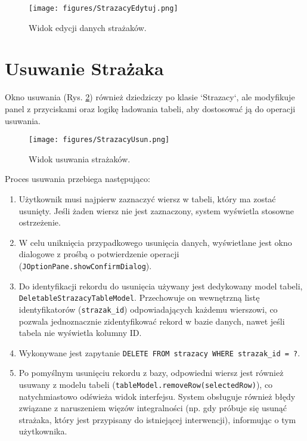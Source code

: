 \begin{figure}[H]
	\centering
	\texttt{[image: figures/StrazacyEdytuj.png]}
	\caption{Widok edycji danych strażaków.}
	\label{fig:strazacy_edytuj_widok}
\end{figure}

\section*{Usuwanie Strażaka}
\label{sec:strazacy_usuwanie}

Okno usuwania (Rys. \ref{fig:strazacy_usun_widok}) również dziedziczy po klasie `Strazacy`, ale modyfikuje panel z przyciskami oraz logikę ładowania tabeli, aby dostosować ją do operacji usuwania.

\begin{figure}[H]
	\centering
	\texttt{[image: figures/StrazacyUsun.png]}
	\caption{Widok usuwania strażaków.}
	\label{fig:strazacy_usun_widok}
\end{figure}

Proces usuwania przebiega następująco:
\begin{enumerate}
    \item Użytkownik musi najpierw zaznaczyć wiersz w tabeli, który ma zostać usunięty. Jeśli żaden wiersz nie jest zaznaczony, system wyświetla stosowne ostrzeżenie.
    \item W celu uniknięcia przypadkowego usunięcia danych, wyświetlane jest okno dialogowe z prośbą o potwierdzenie operacji (\texttt{JOptionPane.showConfirmDialog}).
    \item Do identyfikacji rekordu do usunięcia używany jest dedykowany model tabeli, \texttt{DeletableStrazacyTableModel}. Przechowuje on wewnętrzną listę identyfikatorów (\texttt{strazak\_id}) odpowiadających każdemu wierszowi, co pozwala jednoznacznie zidentyfikować rekord w bazie danych, nawet jeśli tabela nie wyświetla kolumny ID.
    \item Wykonywane jest zapytanie \texttt{DELETE FROM strazacy WHERE strazak\_id = ?}.
    \item Po pomyślnym usunięciu rekordu z bazy, odpowiedni wiersz jest również usuwany z modelu tabeli (\texttt{tableModel.removeRow(selectedRow)}), co natychmiastowo odświeża widok interfejsu. System obsługuje również błędy związane z naruszeniem więzów integralności (np. gdy próbuje się usunąć strażaka, który jest przypisany do istniejącej interwencji), informując o tym użytkownika.
\end{enumerate}